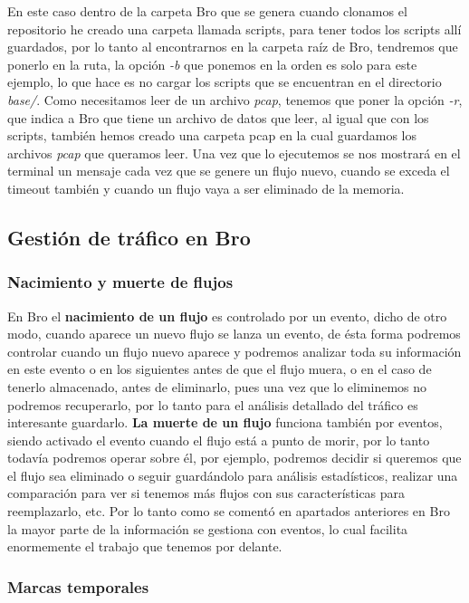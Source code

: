 \noindent En este caso dentro de la carpeta Bro que se genera cuando clonamos el 
repositorio he creado una carpeta llamada scripts, para tener todos los 
scripts allí guardados, por lo tanto al encontrarnos en la carpeta raíz 
de Bro, tendremos que ponerlo en la ruta, la opción \textit{-b} que ponemos en la 
orden es solo para este ejemplo, lo que hace es no cargar los scripts 
que se encuentran en el directorio \textit{base/}. Como necesitamos leer de un 
archivo \textit{pcap}, tenemos que poner la opción \textit{-r}, que indica a Bro que tiene 
un archivo de datos que leer, al igual que con los scripts, también hemos 
creado una carpeta pcap en la cual guardamos los archivos \textit{pcap} que queramos 
leer. Una vez que lo ejecutemos se nos mostrará en el terminal un mensaje 
cada vez que se genere un flujo nuevo, cuando se exceda el timeout también 
y cuando un flujo vaya a ser eliminado de la memoria.

\subsection{Gestión de tráfico en Bro}

\subsubsection{Nacimiento y muerte de flujos}

En Bro el \textbf{nacimiento de un flujo} es controlado por un evento, dicho de otro 
modo, cuando aparece un nuevo flujo se lanza un evento, de ésta forma podremos 
controlar cuando un flujo nuevo aparece y podremos analizar toda su información 
en este evento o en los siguientes antes de que el flujo muera, o en el caso de 
tenerlo almacenado, antes de eliminarlo, pues una vez que lo eliminemos no 
podremos recuperarlo, por lo tanto para el análisis detallado del tráfico es 
interesante guardarlo.
\intro
\textbf{La muerte de un flujo} funciona también por eventos, siendo activado el evento cuando el 
flujo está a punto de morir, por lo tanto todavía podremos operar sobre él, 
por ejemplo, podremos decidir si queremos que el flujo sea eliminado o seguir 
guardándolo para análisis estadísticos, realizar una comparación para ver si tenemos más 
flujos con sus características para reemplazarlo, etc.
\intro
Por lo tanto como se comentó en apartados anteriores en Bro la mayor parte de 
la información se gestiona con eventos, lo cual facilita enormemente el trabajo 
que tenemos por delante.

\subsubsection{Marcas temporales}


